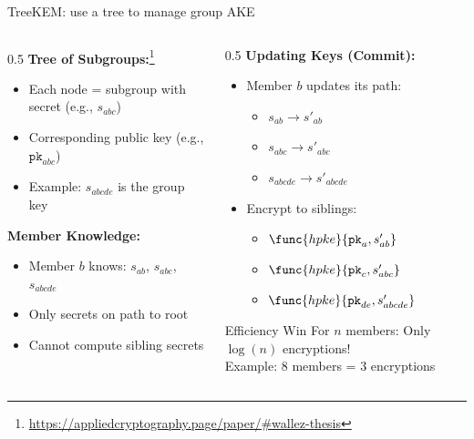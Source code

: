 \ifdefined\PRESENTATION\else\PassOptionsToClass{handout}{beamer}\fi\documentclass[aspectratio=169, lualatex]{beamer}
\begin{document}
\begin{frame}{TreeKEM: use a tree to manage group AKE}
	\begin{columns}[c]
		\begin{column}{0.5\textwidth}
			\textbf{Tree of Subgroups:}\footnote{\url{https://appliedcryptography.page/paper/\#wallez-thesis}}
			\begin{itemize}
				\item Each node = subgroup with secret (e.g., $s_{abc}$)
				\item Corresponding public key (e.g., $\texttt{pk}_{abc}$)
				\item Example: $s_{abcde}$ is the group key
			\end{itemize}
			\textbf{Member Knowledge:}
			\begin{itemize}
				\item Member $b$ knows: $s_{ab}$, $s_{abc}$, $s_{abcde}$
				\item Only secrets on path to root
				\item Cannot compute sibling secrets
			\end{itemize}
		\end{column}
		\begin{column}{0.5\textwidth}
			\textbf{Updating Keys (Commit):}
			\begin{itemize}
				\item Member $b$ updates its path:
				      \begin{itemize}
					      \item $s_{ab} \rightarrow s'_{ab}$
					      \item $s_{abc} \rightarrow s'_{abc}$
					      \item $s_{abcde} \rightarrow s'_{abcde}$
				      \end{itemize}
				\item Encrypt to siblings:
				      \begin{itemize}
					      \item $\func{hpke}{\texttt{pk}_a, s'_{ab}}$
					      \item $\func{hpke}{\texttt{pk}_c, s'_{abc}}$
					      \item $\func{hpke}{\texttt{pk}_{de}, s'_{abcde}}$
				      \end{itemize}
			\end{itemize}
			\begin{alertblock}{Efficiency Win}
				For $n$ members: Only $\log(n)$ encryptions!\\
				Example: 8 members = 3 encryptions
			\end{alertblock}
		\end{column}
	\end{columns}
\end{frame}
\end{document}
